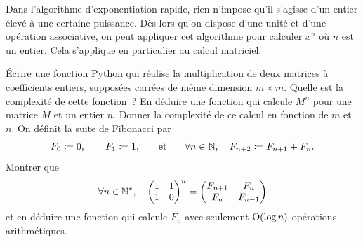 \documentclass{magnolia}
\begin{document}
Dans l'algorithme d'exponentiation rapide, rien n'impose qu'il
s'agisse d'un entier élevé à une certaine puissance. Dès lors qu'on
dispose d'une unité et d'une opération associative, on peut appliquer
cet algorithme pour calculer $x^n$ où $n$ est un entier. Cela
s'applique en particulier au calcul matriciel.
\begin{questions}
\question Écrire une fonction Python qui réalise la multiplication
  de deux matrices à coefficients entiers, supposées carrées de
  même dimension $m\times m$. Quelle est la complexité de cette
  fonction~?
\question En déduire une fonction qui calcule $M^n$ pour une matrice
  $M$ et un entier $n$. Donner la complexité de ce calcul en fonction
  de $m$ et $n$.
\question On définit la suite de Fibonacci par
  \[F_0\coloneqq 0,\qquad F_1\coloneqq   1,\quad\quad\!\text{et}\quad\!\quad
    \forall n\in\mathbb{N},\quad F_{n+2}\coloneqq F_{n+1}+F_n.\]
  Montrer que
  \[\forall n\in{\mathbb{N}^*},\quad
    \begin{pmatrix}
      1 & 1\\
      1 & 0
    \end{pmatrix}^n =
    \begin{pmatrix}
      F_{n+1} & F_n\\
      F_n & F_{n-1}
    \end{pmatrix}\]
    et en déduire une fonction qui calcule $F_n$ avec seulement
    ${\rm O}(\log n)$ opérations arithmétiques.
\end{questions}
\end{document}
